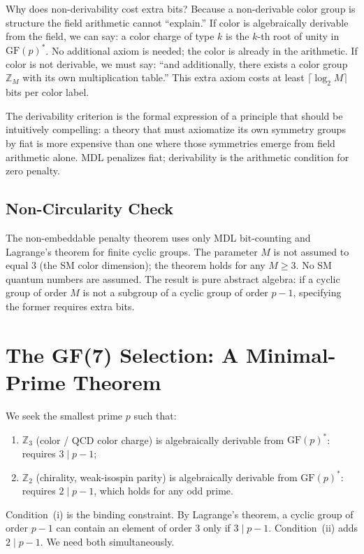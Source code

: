 \documentclass[11pt,openany]{book}
\theoremstyle{remark}
\begin{document}
Why does non-derivability cost extra bits? Because a non-derivable color group is
structure the field arithmetic cannot ``explain.'' If color is algebraically derivable
from the field, we can say: a color charge of type $k$ is the $k$-th root of unity
in $\mathrm{GF}(p)^*$. No additional axiom is needed; the color is already in the
arithmetic. If color is not derivable, we must say: ``and additionally, there exists
a color group $\mathbb{Z}_M$ with its own multiplication table.'' This extra axiom
costs at least $\lceil\log_2 M\rceil$ bits per color label.

The derivability criterion is the formal expression of a principle that should be
intuitively compelling: a theory that must axiomatize its own symmetry groups by
fiat is more expensive than one where those symmetries emerge from field arithmetic
alone. MDL penalizes fiat; derivability is the arithmetic condition for zero penalty.

\subsection*{Non-Circularity Check}

The non-embeddable penalty theorem uses only MDL bit-counting and Lagrange's theorem
for finite cyclic groups. The parameter $M$ is not assumed to equal 3 (the SM color
dimension); the theorem holds for any $M \geq 3$. No SM quantum numbers are assumed.
The result is pure abstract algebra: if a cyclic group of order $M$ is not a subgroup
of a cyclic group of order $p-1$, specifying the former requires extra bits.

\section{The GF(7) Selection: A Minimal-Prime Theorem}
\label{sec:gf7}

We seek the smallest prime $p$ such that:
\begin{enumerate}[label=\textup{(\roman*)},itemsep=2pt]
\item $\mathbb{Z}_3$ (color / QCD color charge) is algebraically derivable from
  $\mathrm{GF}(p)^*$: requires $3 \mid p-1$;
\item $\mathbb{Z}_2$ (chirality, weak-isospin parity) is algebraically derivable
  from $\mathrm{GF}(p)^*$: requires $2 \mid p-1$, which holds for any odd prime.
\end{enumerate}
Condition~(i) is the binding constraint. By Lagrange's theorem, a cyclic group of
order $p-1$ can contain an element of order 3 only if $3 \mid p-1$. Condition~(ii)
adds $2 \mid p-1$. We need both simultaneously.
\end{document}
